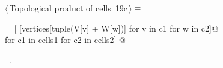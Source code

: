 \documentclass[11pt,oneside]{article}	%
\begin{document}
\begin{flushleft} \small
\begin{minipage}{\linewidth} \label{scrap28}
\protect{}$\langle\,$Topological product of cells\nobreak\ {\footnotesize 19c}$\,\rangle\equiv$
\vspace{-1ex}
\begin{list}{}{} \item
\mbox{}\verb@cells = [ [vertices[tuple(V[v] + W[w])] for v in c1 for w in c2]@\\
\mbox{}\verb@         for c1 in cells1 for c2 in cells2]  @{\NWsep}
\end{list}
\vspace{-1ex}
\footnotesize\addtolength{\baselineskip}{-1ex}
\begin{list}{}{\setlength{\itemsep}{-\parsep}\setlength{\itemindent}{-\leftmargin}}
\item \NWtxtMacroRefIn\ .
\end{list}
\end{minipage}\\[4ex]
\end{flushleft}
\end{document}
